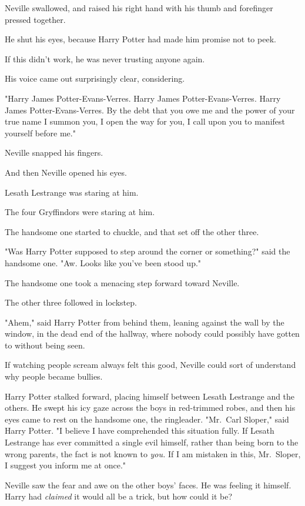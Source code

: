 Neville swallowed, and raised his right hand with his thumb and forefinger
pressed together.

He shut his eyes, because Harry Potter had made him promise not to peek.

If this didn't work, he was never trusting anyone again.

His voice came out surprisingly clear, considering.

"Harry James Potter-Evans-Verres. Harry James Potter-Evans-Verres. Harry James
Potter-Evans-Verres. By the debt that you owe me and the power of your true
name I summon you, I open the way for you, I call upon you to manifest yourself
before me."

Neville snapped his fingers.

And then Neville opened his eyes.

Lesath Lestrange was staring at him.

The four Gryffindors were staring at him.

The handsome one started to chuckle, and that set off the other three.

"Was Harry Potter supposed to step around the corner or something?" said the
handsome one. "Aw. Looks like you've been stood up."

The handsome one took a menacing step forward toward Neville.

The other three followed in lockstep.

"Ahem," said Harry Potter from behind them, leaning against the wall by the
window, in the dead end of the hallway, where nobody could possibly have gotten
to without being seen.

If watching people scream always felt this good, Neville could sort of
understand why people became bullies.

Harry Potter stalked forward, placing himself between Lesath Lestrange and the
others. He swept his icy gaze across the boys in red-trimmed robes, and then
his eyes came to rest on the handsome one, the ringleader. "Mr.~Carl Sloper,"
said Harry Potter. "I believe I have comprehended this situation fully. If
Lesath Lestrange has ever committed a single evil himself, rather than being
born to the wrong parents, the fact is not known to \emph{you.} If I am
mistaken in this, Mr.~Sloper, I suggest you inform me at once."

Neville saw the fear and awe on the other boys' faces. He was feeling it
himself. Harry had \emph{claimed} it would all be a trick, but how could it be?

